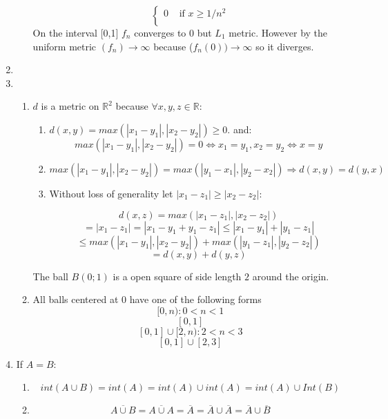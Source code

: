 \documentclass[11pt] {article}
\newcommand{\R}{\mathbb{R}}
\begin{document}
\begin{enumerate}
\begin{enumerate}
\[\begin{cases}
      0  & \text{  if $x \geq 1/n^2 $} \\
  \end{cases}
 \]
 On the interval [0,1] $f_n$ converges to 0 but $L_1$ metric. However by the uniform metric $(f_n) \to \infty $ because ($f_n(0)) \to \infty$ so it diverges.
 \end{enumerate}
 \item
 \item
 \begin{enumerate}
 \item
$d$ is a metric on $\R^2$ because $\forall x,y,z\in \R$:
\begin{enumerate}
\item
$ d(x,y) = max(|x_1 - y_1|,|x_2 - y_2|)  \geq 0$. and:
$$ max(|x_1 - y_1|,|x_2 - y_2|) = 0 \Leftrightarrow x_1 = y_1, x_2 = y_2 \Leftrightarrow x = y $$
\item
$ max(|x_1 - y_1|,|x_2 - y_2|) = max(|y_1 - x_1|,|y_2 - x_2|) \Rightarrow d(x,y) = d(y,x)$
\item Without loss of generality let $|x_1 - z_1| \geq | x_2 - z_2 |$:

$$d(x,z) = max(|x_1 - z_1|, | x_2 - z_2 |)$$
$$= |x_1 - z_1| =  |x_1 - y_1 + y_1 - z_1| \leq  |x_1 - y_1| + |y_1 - z_1| $$
$$\leq max(|x_1 - y_1|,|x_2 - y_2|) + max(|y_1 - z_1|,|y_2 - z_2|)$$
$$ = d(x,y)+d(y,z)$$
\end{enumerate} 
The ball $B(0;1)$ is a open square of side length $2$ around the origin.
\item All balls centered at $0$ have one of the following forms 
$$[0,n):0 < n < 1$$
$$[0,1]$$
$$[0,1 ]\cup [2,n): 2< n < 3$$
$$[0,1]\cup [2,3]$$
 \end{enumerate}
 \item

 If $A = B: $
  \begin{enumerate}
 \item
 $$int(A\cup B) = int(A) = int(A)\cup int(A) = int(A) \cup Int(B)$$
 \item
 $$ \overline{A\cup B}  =  \overline{A \cup A} = \overline{A} = \overline{A} \cup \overline{A} = \overline{A} \cup \overline{B}$$
 \end{enumerate}
 
 
\end{enumerate}
\end{document}
